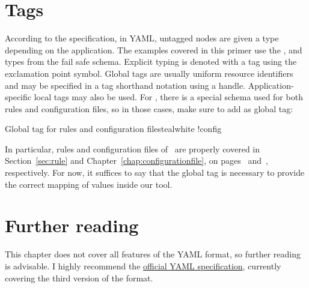 \section{Tags}
\label{sec:yamltags}

According to the specification, in \gls{YAML}, untagged nodes are given a type depending on the application. The examples covered in this primer use the ,  and  types from the fail safe schema. Explicit typing is denoted with a tag using the exclamation point symbol. Global tags are usually uniform resource identifiers and may be specified in a tag shorthand notation using a handle. Application-specific local tags may also be used. For \arara, there is a special schema used for both rules and configuration files, so in those cases, make sure to add  as global tag:

\begin{codebox}{Global tag for rules and configuration files}{teal}{\icnote}{white}
!config
\end{codebox}

In particular, rules and configuration files of \arara\ are properly covered in Section~\ref{sec:rule} and Chapter~\ref{chap:configurationfile}, on pages~\pageref{sec:rule} and~\pageref{chap:configurationfile}, respectively. For now, it suffices to say that the  global tag is necessary to provide the correct mapping of values inside our tool.

\section{Further reading}
\label{sec:yamlfurtherreading}

This chapter does not cover all features of the \gls{YAML} format, so further reading is advisable. I highly recommend the \href{http://yaml.org/spec/1.2/spec.html}{official YAML specification}, currently covering the third version of the format.
